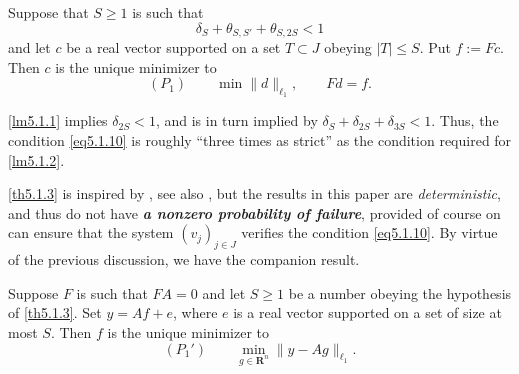 \begin{theorem}
    Suppose that $S \geq 1$ is such that 
    \begin{equation}
        \delta_S+ \theta_{S,S'}+ \theta_{S,2S} <1
        \label{eq5.1.10}
    \end{equation}
    and let $c$ be a real vector supported on a set $T \subset J$ obeying $|T| \leq S$. Put $f:=Fc$. Then $c$ is the unique minimizer to 
    \begin{equation*}
        (P_1) \qquad \min\|d\|_{\ell_1}, \qquad Fd=f.
    \end{equation*}
    \label{th5.1.3}
\end{theorem}
\cref{lm5.1.1} implies $\delta_{2S}<1$, and is in turn implied by $\delta_S+\delta_{2S}+\delta_{3S}<1$. Thus, the condition \cref{eq5.1.10} is roughly ``three times as strict'' as the condition required for \cref{lm5.1.2}.

\cref{th5.1.3} is inspired by \cite{2-7}, see also \cite{Candes2006,Candes2006a}, but the results in this paper are \emph{\textcolor[rgb]{1,0,0}{deterministic}}, and thus do not have \emph{\textbf{\textcolor[rgb]{1,0,0}{a nonzero probability of failure}}}, provided of course on can ensure that the system $(v_j)_{j \in J}$ verifies the condition \cref{eq5.1.10}. By virtue of the previous discussion, we have the companion result.
\begin{theorem}
    Suppose $F$ is such that $FA=0$ and let $S \geq 1$ be a number obeying the hypothesis of \cref{th5.1.3}. Set $y=Af+e$, where $e$ is a real vector supported on a set of size at most $S$. Then $f$ is the unique minimizer to 
    \begin{equation*}
        (P_1') \qquad \min\limits_{g \in \mathbf{R}^n} \|y-Ag\|_{\ell_1}.
    \end{equation*}
    \label{th5.1.4}
\end{theorem}

\begin{center}
\end{center}








